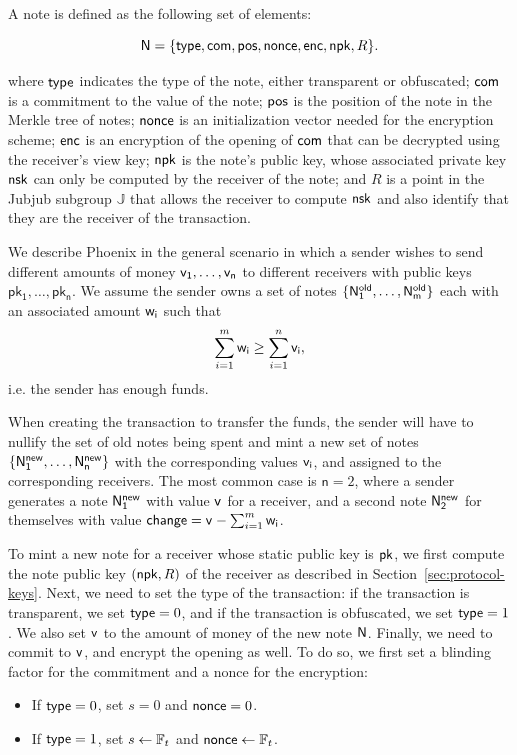 A note is defined as the following set of elements:

$$\mathsf{N} = \{\mathsf{type}, \mathsf{com}, \mathsf{pos}, \mathsf{nonce}, \mathsf{enc}, \mathsf{npk}, R\}.$$

where $\mathsf{type}$ indicates the type of the note, either transparent or obfuscated; $\mathsf{com}$ is a commitment to the value of the note; $\mathsf{pos}$ is the position of the note in the Merkle tree of notes; $\mathsf{nonce}$ is an initialization vector needed for the encryption scheme; $\mathsf{enc}$ is an encryption of the opening of $\mathsf{com}$ that can be decrypted using the receiver's view key; $\mathsf{npk}$ is the note's public key, whose associated private key $\mathsf{nsk}$ can only be computed by the receiver of the note; and $R$ is a point in the Jubjub subgroup $\mathbb{J}$ that allows the receiver to compute $\mathsf{nsk}$ and also identify that they are the receiver of the transaction.

We describe Phoenix in the general scenario in which a sender wishes to send different amounts of money $\mathsf{v_{1}},\dots,\mathsf{v_{n}}$ to different receivers with public keys $\mathsf{pk_1},\dots,\mathsf{pk_n}$. We assume the sender owns a set of notes $\{\mathsf{N^{old}_{1}},\dots,\mathsf{N^{old}_{m}}\}$ each with an associated amount $\mathsf{w_{i}}$ such that \[\sum_{i = 1}^m \mathsf{w_{i}} \geq \sum_{i = 1}^n \mathsf{v_{i}},\] i.e. the sender has enough funds.

When creating the transaction to transfer the funds, the sender will have to nullify the set of old notes being spent and mint a new set of notes $\{\mathsf{N^{new}_{1}},\dots,\mathsf{N^{new}_{n}}\}$ with the corresponding values $\mathsf{v_{i}}$, and assigned to the corresponding receivers. 
The most common case is $\mathsf{n} = 2$, where a sender generates a note $\mathsf{N^{new}_{1}}$ with value $\mathsf{v_{}}$ for a receiver, and a second note $\mathsf{N^{new}_{2}}$ for themselves with value  
$\mathsf{change} = \mathsf{v_{}} - \sum_{i=1}^m\mathsf{w_{i}}$. 

To mint a new note for a receiver whose static public key is $\mathsf{pk}$, we first compute the note public key $(\mathsf{npk}, R)$ of the receiver as described in Section~\ref{sec:protocol-keys}. Next, we need to set the type of the transaction: if the transaction is transparent, we set $\mathsf{type} = 0$, and if the transaction is obfuscated, we set $\mathsf{type} = 1$. We also set $\mathsf{v_{}}$ to the amount of money of the new note $\mathsf{N}{}$. Finally, we need to commit to $\mathsf{v_{}}$, and encrypt the opening as well. To do so, we first set a blinding factor for the commitment and a nonce for the encryption:

\begin{itemize}
	\item If $\mathsf{type} = 0$, set $s = 0$ and $\mathsf{nonce} = 0$.
	\item If $\mathsf{type} = 1$, set $s \leftarrow \mathbb{F}_{t}$ and $\mathsf{nonce} \leftarrow \mathbb{F}_t$.
\end{itemize}


